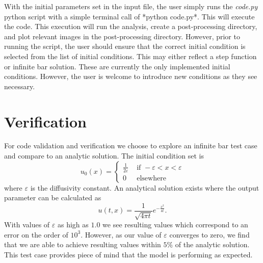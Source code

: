 \documentclass[12pt,letterpaper]{article}
\begin{document}
With the initial parameters set in the input file, the user simply runs the \emph{code.py} python script with a simple terminal call of *python code.py*. This will execute the code. This execution will run the analysis, create a post-processing directory, and plot relevant images in the post-processing directory. However, prior to running the script, the user should ensure that the correct initial condition is selected from the list of initial conditions. This may either reflect a step function or infinite bar solution. These are currently the only implemented initial conditions. However, the user is welcome to introduce new conditions as they see necessary.
\section*{Verification}
For code validation and verification we choose to explore an infinite bar test case and compare to an analytic solution. The initial condition set is 
\begin{equation}
    u_{0}(x)=\left\{\begin{array}{ll}
{\frac{1}{2 \varepsilon}} & {\text { if }-\varepsilon<x<\varepsilon} \\
{0} & {\text { elsewhere }}
\end{array}\right.
\end{equation}
where $\varepsilon$ is the diffusivity constant. An analytical solution exists where the output parameter can be calculated as 
\begin{equation}
    u(t, x)=\frac{1}{\sqrt{4 \pi t}} e^{-\frac{x^{2}}{4 t}}\texttt{.}
\end{equation}
With values of $\varepsilon$ as high as $1.0$ we see resulting values which correspond to an error on the order of $10^3$. However, as our value of $\varepsilon$ converges to zero, we find that we are able to achieve resulting values within $5\%$ of the analytic solution. This test case provides piece of mind that the model is performing as expected.    
\end{document}
